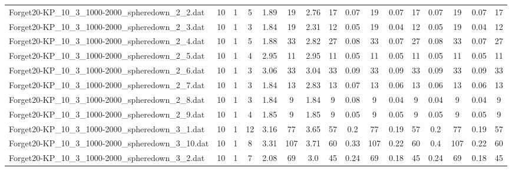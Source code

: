 \begin{sidewaystable}[!ht]
{\begin{tabular}{lccccccccccccccc}
Forget20-KP\_10\_3\_1000-2000\_spheredown\_2\_2.dat & 10 & 1 & 5 & 1.89 & 19 & 2.76 & 17 &  \textcolor{blue2}{0.07} & 19 &  \textcolor{blue2}{0.07} & 17 &  \textcolor{blue2}{0.07} & 19 &  \textcolor{blue2}{0.07} & 17 \\
Forget20-KP\_10\_3\_1000-2000\_spheredown\_2\_3.dat & 10 & 1 & 3 & 1.84 & 19 & 2.31 & 12 & 0.05 & 19 &  \textcolor{blue2}{0.04} & 12 & 0.05 & 19 &  \textcolor{blue2}{0.04} & 12 \\
Forget20-KP\_10\_3\_1000-2000\_spheredown\_2\_4.dat & 10 & 1 & 5 & 1.88 & 33 & 2.82 & 27 & 0.08 & 33 &  \textcolor{blue2}{0.07} & 27 & 0.08 & 33 &  \textcolor{blue2}{0.07} & 27 \\
Forget20-KP\_10\_3\_1000-2000\_spheredown\_2\_5.dat & 10 & 1 & 4 & 2.95 & 11 & 2.95 & 11 &  \textcolor{blue2}{0.05} & 11 &  \textcolor{blue2}{0.05} & 11 &  \textcolor{blue2}{0.05} & 11 &  \textcolor{blue2}{0.05} & 11 \\
Forget20-KP\_10\_3\_1000-2000\_spheredown\_2\_6.dat & 10 & 1 & 3 & 3.06 & 33 & 3.04 & 33 &  \textcolor{blue2}{0.09} & 33 &  \textcolor{blue2}{0.09} & 33 &  \textcolor{blue2}{0.09} & 33 &  \textcolor{blue2}{0.09} & 33 \\
Forget20-KP\_10\_3\_1000-2000\_spheredown\_2\_7.dat & 10 & 1 & 3 & 1.84 & 13 & 2.83 & 13 & 0.07 & 13 &  \textcolor{blue2}{0.06} & 13 &  \textcolor{blue2}{0.06} & 13 &  \textcolor{blue2}{0.06} & 13 \\
Forget20-KP\_10\_3\_1000-2000\_spheredown\_2\_8.dat & 10 & 1 & 3 & 1.84 & 9 & 1.84 & 9 & 0.08 & 9 &  \textcolor{blue2}{0.04} & 9 &  \textcolor{blue2}{0.04} & 9 &  \textcolor{blue2}{0.04} & 9 \\
Forget20-KP\_10\_3\_1000-2000\_spheredown\_2\_9.dat & 10 & 1 & 4 & 1.85 & 9 & 1.85 & 9 &  \textcolor{blue2}{0.05} & 9 &  \textcolor{blue2}{0.05} & 9 &  \textcolor{blue2}{0.05} & 9 &  \textcolor{blue2}{0.05} & 9 \\
Forget20-KP\_10\_3\_1000-2000\_spheredown\_3\_1.dat & 10 & 1 & 12 & 3.16 & 77 & 3.65 & 57 & 0.2 & 77 &  \textcolor{blue2}{0.19} & 57 & 0.2 & 77 &  \textcolor{blue2}{0.19} & 57 \\
Forget20-KP\_10\_3\_1000-2000\_spheredown\_3\_10.dat & 10 & 1 & 8 & 3.31 & 107 & 3.71 & 60 & 0.33 & 107 &  \textcolor{blue2}{0.22} & 60 & 0.4 & 107 &  \textcolor{blue2}{0.22} & 60 \\
Forget20-KP\_10\_3\_1000-2000\_spheredown\_3\_2.dat & 10 & 1 & 7 & 2.08 & 69 & 3.0 & 45 & 0.24 & 69 &  \textcolor{blue2}{0.18} & 45 & 0.24 & 69 &  \textcolor{blue2}{0.18} & 45 \\

\end{tabular}}
\end{sidewaystable}
